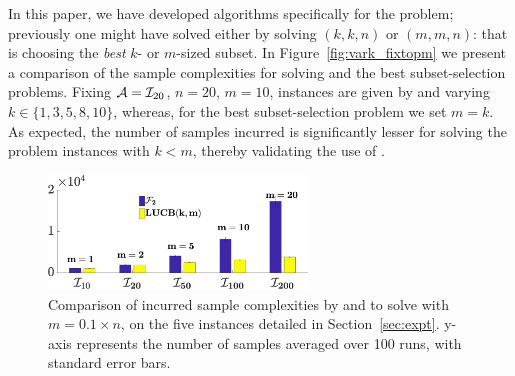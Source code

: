 In this paper, we have developed algorithms specifically for the \QFK problem; previously one might have solved \QFK either by solving $(k, k, n)$ or $(m, m, n)$: that is choosing the \textit{best} $k$- or $m$-sized subset.  In Figure~\ref{fig:vark_fixtopm} we present a comparison of the sample complexities 
for solving  \QFK and the best subset-selection problems. 
Fixing $\mathcal{A} = \mathcal{I}_{20}$, $n=20$, $m = 10$, \QFK instances 
are given by and varying $k \in \{1, 3, 5, 8, 10\}$, whereas, for the best subset-selection problem we set $m =k$.
As expected, the number of samples incurred is significantly lesser for solving the problem instances with $k < m$, thereby validating the use of \GLUCB. %






\begin{figure}[h]
\centering
 \includegraphics[height=1.2in]{compare_sc_f2_glucb_short.eps}
 \caption{Comparison of incurred sample complexities by \FF and \GLUCB 
	  to solve \QF with  $m= 0.1 \times n$, on the five instances
	  detailed in Section~\ref{sec:expt}.
	  y-axis represents the number of samples averaged over 100 runs, with standard error bars.}
 \label{fig:scf2glucb}
\end{figure}

